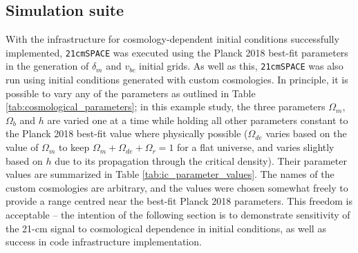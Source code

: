 \documentclass[floats,floatfix,showpacs,amssymb,prd,superscriptaddress,nofootinbib]{revtex4-2} %
\newcommand{\code}{\texttt}
\begin{document}
\subsection{Simulation suite}
With the infrastructure for cosmology-dependent initial conditions successfully implemented, \code{21cmSPACE} was executed using the Planck 2018 best-fit parameters \citep{Planck2018results} in the generation of $\delta_m$ and $v_{bc}$ initial grids. As well as this, \code{21cmSPACE} was also run using initial conditions generated with custom cosmologies. In principle, it is possible to vary any of the parameters as outlined in Table \ref{tab:cosmological_parameters}; in this example study, the three parameters $\Omega_m$, $\Omega_b$ and $h$ are varied one at a time while holding all other parameters constant to the Planck 2018 best-fit value where physically possible ($\Omega_{de}$ varies based on the value of $\Omega_m$ to keep $\Omega_m + \Omega_{de} + \Omega_r= 1$ for a flat universe, and varies slightly based on $h$ due to its propagation through the critical density). Their parameter values are summarized in Table \ref{tab:ic_parameter_values}. The names of the custom cosmologies are arbitrary, and the values were chosen somewhat freely to provide a range centred near the best-fit Planck 2018 parameters. This freedom is acceptable -- the intention of the following section is to demonstrate sensitivity of the 21-cm signal to cosmological dependence in initial conditions, as well as success in code infrastructure implementation.
\end{document}
